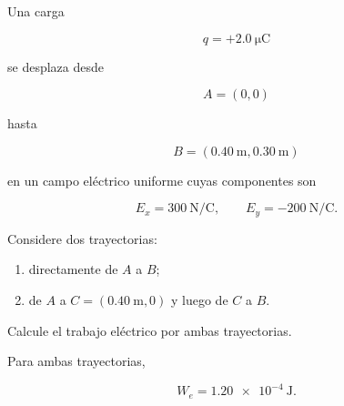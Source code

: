 \begin{ejercicio}

Una carga

\[
q=+\SI{2.0}{\micro\coulomb}
\]

se desplaza desde

\[
A=(0,0)
\]

hasta

\[
B=(\SI{0.40}{\metre},\SI{0.30}{\metre})
\]

en un campo eléctrico uniforme cuyas componentes son

\[
E_x=\SI{300}{\newton\per\coulomb},
\qquad
E_y=-\SI{200}{\newton\per\coulomb}.
\]

Considere dos trayectorias:

\begin{enumerate}
    \item directamente de \(A\) a \(B\);
    \item de \(A\) a \(C=(\SI{0.40}{\metre},0)\) y luego de \(C\) a \(B\).
\end{enumerate}

\begin{center}
\end{center}

Calcule el trabajo eléctrico por ambas trayectorias.

\end{ejercicio}

\begin{respuesta}

Para ambas trayectorias,

\[
\boxed{W_e=\SI{1.20e-4}{\joule}}.
\]

\end{respuesta}

